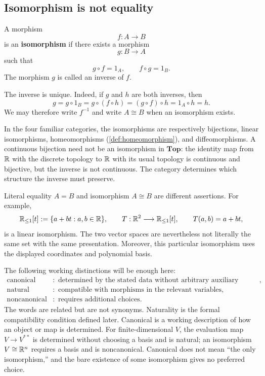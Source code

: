 \subsection{Isomorphism is not equality}
\begin{definition}[Isomorphism]\label{def:categorical-isomorphism}
A morphism
\[
f:A\longrightarrow B
\]
is an \textbf{isomorphism} if there exists a morphism
\[
g:B\longrightarrow A
\]
such that
\[
g\circ f=1_A,
\qquad
f\circ g=1_B.
\]
The morphism $g$ is called an inverse of $f$.
\end{definition}

The inverse is unique. Indeed, if $g$ and $h$ are both inverses, then
\[
g=g\circ1_B=g\circ(f\circ h)
=(g\circ f)\circ h=1_A\circ h=h.
\]
We may therefore write $f^{-1}$ and write $A\cong B$ when an isomorphism
exists.

In the four familiar categories, the isomorphisms are respectively
bijections, linear isomorphisms, homeomorphisms
(\cref{def:homeomorphism}), and diffeomorphisms. A continuous bijection need
not be an isomorphism in $\mathbf{Top}$: the identity map from $\mathbb{R}$ with the
discrete topology to $\mathbb{R}$ with its usual topology is continuous and
bijective, but the inverse is not continuous. The category determines which
structure the inverse must preserve.

Literal equality $A=B$ and isomorphism $A\cong B$ are different assertions.
For example,
\[
\mathbb{R}_{\leq1}[t]:=\{a+bt:a,b\in\mathbb{R}\},
\qquad
T:\mathbb{R}^2\longrightarrow\mathbb{R}_{\leq1}[t],
\qquad
T(a,b)=a+bt,
\]
is a linear isomorphism. The two vector spaces are nevertheless not literally
the same set with the same presentation. Moreover, this particular
isomorphism uses the displayed coordinates and polynomial basis.

\begin{remark}
The following working distinctions will be enough here:
\[
\boxed{\begin{aligned}
\text{canonical}
&:\text{ determined by the stated data without arbitrary auxiliary choices},\\
\text{natural}
&:\text{ compatible with morphisms in the relevant variables},\\
\text{noncanonical}
&:\text{ requires additional choices}.
\end{aligned}}
\]
The words are related but are not synonyms. Naturality is the formal
compatibility condition defined later. Canonical is a working description of
how an object or map is determined. For finite-dimensional $V$, the
evaluation map $V\to V^{**}$ is determined without choosing a basis and is
natural; an isomorphism $V\cong\mathbb{R}^n$ requires a basis and is noncanonical.
Canonical does not mean ``the only isomorphism,'' and the bare existence of
some isomorphism gives no preferred choice.
\end{remark}

